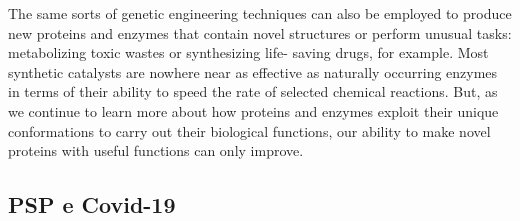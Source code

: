 The same sorts of genetic engineering techniques can also be employed
to produce new proteins and enzymes that contain novel structures or
perform unusual tasks: metabolizing toxic wastes or synthesizing life-
saving drugs, for example. Most synthetic catalysts are nowhere near as
effective as naturally occurring enzymes in terms of their ability to speed
the rate of selected chemical reactions. But, as we continue to learn more
about how proteins and enzymes exploit their unique conformations to
carry out their biological functions, our ability to make novel proteins
with useful functions can only improve. \supercite{alberts}

\subsection{PSP e Covid-19}